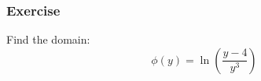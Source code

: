 \documentclass[12pt]{beamer}
\begin{document}
	\begin{frame}
		\frametitle{Exercise}
		\vspace*{\fill}
		\vspace*{\fill}
		\initclock
		\Large
		Find the domain:
		\vspace*{\fill}
		\vspace*{\fill}
		\[\phi(y) = \ln{\left(\frac{y-4}{y^3}\right)}\]\\ %
		\vspace*{\fill}
		\vspace*{\fill}
		\vspace*{\fill}
		\vspace*{\fill}
		\vspace*{\fill}
		\crono
	\end{frame}
\end{document}
